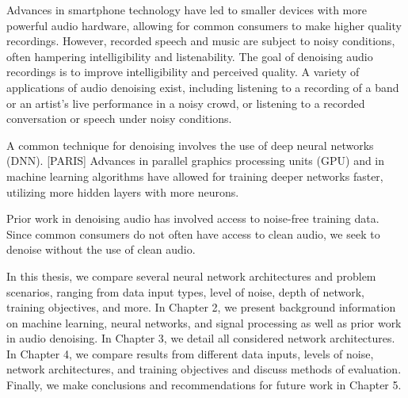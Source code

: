 Advances in smartphone technology have led to smaller devices with more powerful audio hardware, allowing for common consumers to make higher quality recordings. However, recorded speech and music are subject to noisy conditions, often hampering intelligibility and listenability. The goal of denoising audio recordings is to improve intelligibility and perceived quality. A variety of applications of audio denoising exist, including listening to a recording of a band or an artist's live performance in a noisy crowd, or listening to a recorded conversation or speech under noisy conditions.

A common technique for denoising involves the use of deep neural networks (DNN). [PARIS] Advances in parallel graphics processing units (GPU) and in machine learning algorithms have allowed for training deeper networks faster, utilizing more hidden layers with more neurons.

Prior work in denoising audio has involved access to noise-free training data. Since common consumers do not often have access to clean audio, we seek to denoise without the use of clean audio.

In this thesis, we compare several neural network architectures and problem scenarios, ranging from data input types, level of noise, depth of network, training objectives, and more. In Chapter 2, we present background information on machine learning, neural networks, and signal processing as well as prior work in audio denoising. In Chapter 3, we detail all considered network architectures. In Chapter 4, we compare results from different data inputs, levels of noise, network architectures, and training objectives and discuss methods of evaluation. Finally, we make conclusions and recommendations for future work in Chapter 5.
